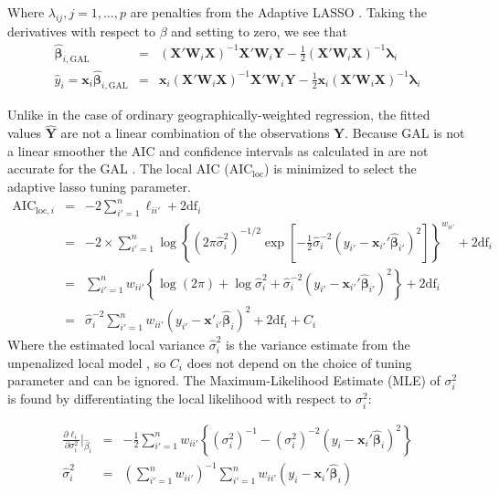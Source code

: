 \documentclass[authoryear, review, 11pt]{elsarticle}
\begin{document}
	Where $\lambda_{ij}, j =1, \dots, p$ are penalties from the Adaptive LASSO \citep{Zou:2006}. Taking the derivatives with respect to $\beta$ and setting to zero, we see that
	\begin{eqnarray}
		\hat{\bm{\beta}}_{i, \text{GAL}} &=& \left( \bm{X}'\bm{W}_i\bm{X} \right)^{-1}  \bm{X}'\bm{W}_i\bm{Y}  - \frac{1}{2} \left(\bm{X}'\bm{W}_i\bm{X} \right)^{-1} \bm{\lambda}_i\\
		\hat{y}_i = \bm{x}_i \hat{\bm{\beta}}_{i, \text{GAL}} &=&  \bm{x}_i \left( \bm{X}'\bm{W}_i\bm{X} \right)^{-1}  \bm{X}'\bm{W}_i\bm{Y}  - \frac{1}{2} \bm{x}_i \left(\bm{X}'\bm{W}_i\bm{X} \right)^{-1} \bm{\lambda}_i
	\end{eqnarray}
	
	Unlike in the case of ordinary geographically-weighted regression, the fitted values $\hat{\bm{Y}}$ are not a linear combination of the observations $\bm{Y}$. Because GAL is not a linear smoother the AIC and confidence intervals as calculated in \cite{Fotheringham:2002} are not accurate for the GAL \citep{Zou:2006}. The local AIC ($\mbox{AIC}_{\mbox{loc}}$) is minimized to select the adaptive lasso tuning parameter.
	\begin{eqnarray}
		\mbox{AIC}_{\mbox{loc}, i} &=& -2 \sum_{i'=1}^n \ell_{ii'}  + 2 \mbox{df}_i\\
		&=& -2 \times \sum_{i'=1}^n \log \left\{ \left(2 \pi \hat{\sigma}_i^2\right)^{-1/2} \exp \left[-\frac{1}{2} \hat{\sigma}_i^{-2} \left(y_{i'} - \bm{x}_{i'}' \hat{\bm{\beta}}_{i'} \right)^2\right] \right\}^{w_{ii'}} + 2\mbox{df}_i\\
		&=& \sum_{i'=1}^n w_{ii'} \left\{ \log \left(2 \pi \right) + \log \hat{\sigma}_i^2 + \hat{\sigma}_i^{-2} \left(y_{i'} - \bm{x}_{i'}' \hat{\bm{\beta}}_{i'} \right)^2 \right\} + 2\mbox{df}_i \\
		&=& \hat{\sigma}_i^{-2} \sum_{i'=1}^n w_{ii'} \left( y_{i'} - \bm{x}'_{i'} \hat{\bm{\beta}}_i \right)^2 + 2 \mbox{df}_i + C_i
	\end{eqnarray}	
	Where the estimated local variance $\hat{\sigma}_i^2$ is the variance estimate from the unpenalized local model \citep{Zou:2007}, so $C_i$ does not depend on the choice of tuning parameter and can be ignored. The Maximum-Likelihood Estimate (MLE) of $\sigma_i^2$ is found by differentiating the local likelihood with respect to $\sigma_i^2$:
	
	\begin{eqnarray}
		\frac{\partial \ell_i}{\partial \sigma_i^2} \bigg|_{\hat{\beta}_i} &=& -\frac{1}{2} \sum_{i'=1}^n w_{ii'} \left\{ \left(\sigma_i^{2}\right)^{-1} - \left(\sigma_i^{2}\right)^{-2} \left( y_i - \bm{x}_i'\bm{\hat{\beta}}_i \right)^2 \right\} \\
		\hat{\sigma}_i^2 &=& \left(\sum_{i'=1}^n w_{ii'}\right)^{-1} \sum_{i'=1}^n w_{ii'} \left(y_i - \bm{x}_i'\hat{\bm{\beta}}_i\right)
	\end{eqnarray}
	 
\end{document}
